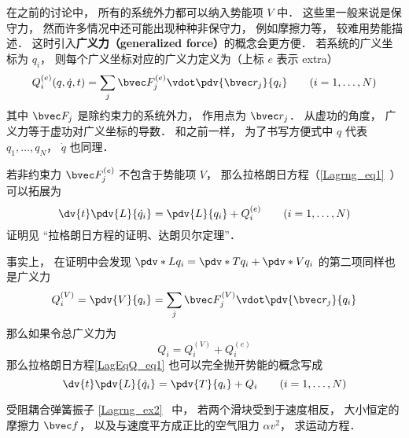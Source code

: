 
\begin{issues}
\issueTODO
\end{issues}


在之前的讨论中， 所有的系统外力都可以纳入势能项 $V$ 中． 这些里一般来说是保守力， 然而许多情况中还可能出现种种非保守力， 例如摩擦力等， 较难用势能描述． 这时引入\textbf{广义力（generalized force）}的概念会更方便． 若系统的广义坐标为 $q_i$， 则每个广义坐标对应的广义力定义为（上标 $e$ 表示 extra）
\begin{equation}
Q_i^{(e)}(q, \dot q, t) = \sum_j \bvec F_j^{(e)} \vdot \pdv{\bvec r_j}{q_i} \qquad (i=1,\dots,N)
\end{equation}
其中 $\bvec F_j$ 是除约束力的系统外力， 作用点为 $\bvec r_j$． 从虚功的角度， 广义力等于虚功对广义坐标的导数． 和之前一样， 为了书写方便式中 $q$ 代表 $q_1, \dots, q_N$， $\dot q$ 也同理．

若非约束力 $\bvec F_j^{(e)}$ 不包含于势能项 $V$， 那么拉格朗日方程（\autoref{Lagrng_eq1}~）可以拓展为
\begin{equation}\label{LagEqQ_eq1}
\dv{t} \pdv{L}{\dot q_i} = \pdv{L}{q_i} + Q_i^{(e)}
\qquad (i=1,\dots,N)
\end{equation}
证明见 “拉格朗日方程的证明、达朗贝尔定理”．

事实上， 在证明中会发现 $\pdv*{L}{q_i} = \pdv*{T}{q_i} + \pdv*{V}{q_i}$ 的第二项同样也是广义力
\begin{equation}
Q_i^{(V)} = \pdv{V}{q_i} = \sum_j \bvec F_j^{(V)} \vdot \pdv{\bvec r_j}{q_i}
\end{equation}
那么如果令总广义力为
\begin{equation}
Q_i = Q_i^{(V)} + Q_i^{(e)}
\end{equation}
那么拉格朗日方程\autoref{LagEqQ_eq1} 也可以完全抛开势能的概念写成
\begin{equation}\label{LagEqQ_eq2}
\dv{t} \pdv{L}{\dot q_i} = \pdv{T}{q_i} + Q_i
\qquad (i=1,\dots,N)
\end{equation}


\begin{example}{受阻耦合弹簧振子}
\autoref{Lagrng_ex2}~ 中， 若两个滑块受到于速度相反， 大小恒定的摩擦力 $\bvec f$， 以及与速度平方成正比的空气阻力 $\alpha v^2$， 求运动方程．
\end{example}
